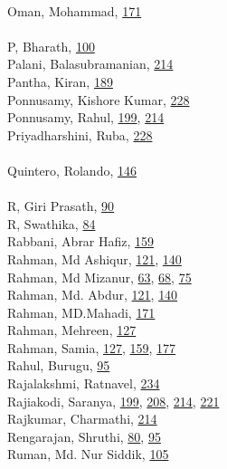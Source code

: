 \documentclass[11pt,oneside]{book}
\begin{document}
\begin{multicols}{2}
\\ %
Oman, Mohammad, \hyperlink{page.171}{171}\\
\\ %
P, Bharath, \hyperlink{page.100}{100}\\
Palani, Balasubramanian, \hyperlink{page.214}{214}\\
Pantha, Kiran, \hyperlink{page.189}{189}\\
Ponnusamy, Kishore Kumar, \hyperlink{page.228}{228}\\
Ponnusamy, Rahul, \hyperlink{page.199}{199}, \hyperlink{page.214}{214}\\
Priyadharshini, Ruba, \hyperlink{page.228}{228}\\
\\ %
Quintero, Rolando, \hyperlink{page.146}{146}\\
\\ %
R, Giri Prasath, \hyperlink{page.90}{90}\\
R, Swathika, \hyperlink{page.84}{84}\\
Rabbani, Abrar Hafiz, \hyperlink{page.159}{159}\\
Rahman, Md Ashiqur, \hyperlink{page.121}{121}, \hyperlink{page.140}{140}\\
Rahman, Md Mizanur, \hyperlink{page.63}{63}, \hyperlink{page.68}{68}, \hyperlink{page.75}{75}\\
Rahman, Md. Abdur, \hyperlink{page.121}{121}, \hyperlink{page.140}{140}\\
Rahman, MD.Mahadi, \hyperlink{page.171}{171}\\
Rahman, Mehreen, \hyperlink{page.127}{127}\\
Rahman, Samia, \hyperlink{page.127}{127}, \hyperlink{page.159}{159}, \hyperlink{page.177}{177}\\
Rahul, Burugu, \hyperlink{page.95}{95}\\
Rajalakshmi, Ratnavel, \hyperlink{page.234}{234}\\
Rajiakodi, Saranya, \hyperlink{page.199}{199}, \hyperlink{page.208}{208}, \hyperlink{page.214}{214}, \hyperlink{page.221}{221}\\
Rajkumar, Charmathi, \hyperlink{page.214}{214}\\
Rengarajan, Shruthi, \hyperlink{page.80}{80}, \hyperlink{page.95}{95}\\
Ruman, Md. Nur Siddik, \hyperlink{page.105}{105}\\
\\ %

\end{multicols}
\end{document}
